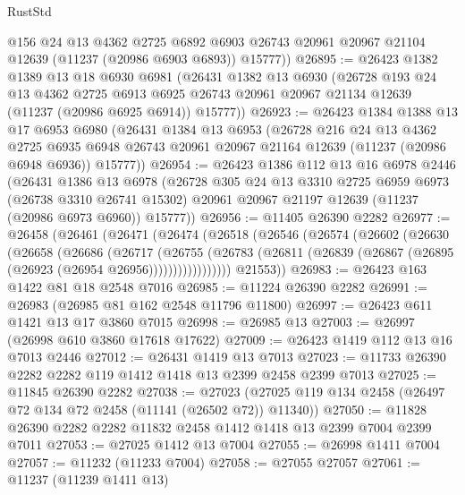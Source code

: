\begin{lexlean}{RustStd}
\begin{coremodule}
        @156
        @24
        @13
        @4362
        @2725
        @6892
        @6903
        @26743
        @20961
        @20967
        @21104
        @12639
        (@11237 (@20986 @6903 @6893))
        @15777))
@26895 := @26423
    @1382
    @1389
    @13
    @18
    @6930
    @6981
    (@26431
      @1382
      @13
      @6930
      (@26728
        @193
        @24
        @13
        @4362
        @2725
        @6913
        @6925
        @26743
        @20961
        @20967
        @21134
        @12639
        (@11237 (@20986 @6925 @6914))
        @15777))
@26923 := @26423
    @1384
    @1388
    @13
    @17
    @6953
    @6980
    (@26431
      @1384
      @13
      @6953
      (@26728
        @216
        @24
        @13
        @4362
        @2725
        @6935
        @6948
        @26743
        @20961
        @20967
        @21164
        @12639
        (@11237 (@20986 @6948 @6936))
        @15777))
@26954 := @26423
    @1386
    @112
    @13
    @16
    @6978
    @2446
    (@26431
      @1386
      @13
      @6978
      (@26728
        @305
        @24
        @13
        @3310
        @2725
        @6959
        @6973
        (@26738 @3310 @26741 @15302)
        @20961
        @20967
        @21197
        @12639
        (@11237 (@20986 @6973 @6960))
        @15777))
@26956 := @11405 @26390 @2282
@26977 := @26458
    (@26461
      (@26471
        (@26474
          (@26518
            (@26546
              (@26574
                (@26602
                  (@26630
                    (@26658
                      (@26686
                        (@26717
                          (@26755
                            (@26783
                              (@26811
                                (@26839 (@26867 (@26895 (@26923 (@26954 @26956)))))))))))))))))
        @21553))
@26983 := @26423 @163 @1422 @81 @18 @2548 @7016
@26985 := @11224 @26390 @2282
@26991 := @26983 (@26985 @81 @162 @2548 @11796 @11800)
@26997 := @26423 @611 @1421 @13 @17 @3860 @7015
@26998 := @26985 @13
@27003 := @26997 (@26998 @610 @3860 @17618 @17622)
@27009 := @26423 @1419 @112 @13 @16 @7013 @2446
@27012 := @26431 @1419 @13 @7013
@27023 := @11733 @26390 @2282 @2282 @119 @1412 @1418 @13 @2399 @2458 @2399 @7013
@27025 := @11845 @26390 @2282
@27038 := @27023 (@27025 @119 @134 @2458 (@26497 @72 @134 @72 @2458 (@11141 (@26502 @72)) @11340))
@27050 := @11828 @26390 @2282 @2282 @11832 @2458 @1412 @1418 @13 @2399 @7004 @2399 @7011
@27053 := @27025 @1412 @13 @7004
@27055 := @26998 @1411 @7004
@27057 := @11232 (@11233 @7004)
@27058 := @27055 @27057
@27061 := @11237 (@11239 @1411 @13)

\end{coremodule}
\end{lexlean}
